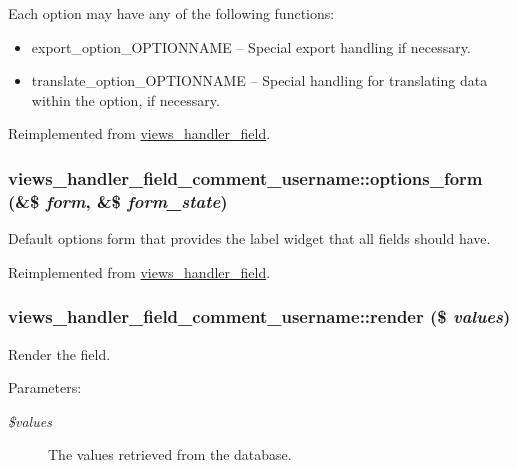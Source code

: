  Each option may have any of the following functions:\begin{itemize}
\item export\_\-option\_\-OPTIONNAME -- Special export handling if necessary.\item translate\_\-option\_\-OPTIONNAME -- Special handling for translating data within the option, if necessary. \end{itemize}


Reimplemented from \hyperlink{classviews__handler__field_64c69a8a3697603f8283405071c25b76}{views\_\-handler\_\-field}.\hypertarget{classviews__handler__field__comment__username_9bcc4bbe9ebbd7247431cfc18c5bab9c}{
\subsubsection[{options\_\-form}]{\setlength{\rightskip}{0pt plus 5cm}views\_\-handler\_\-field\_\-comment\_\-username::options\_\-form (\&\$ {\em form}, \/  \&\$ {\em form\_\-state})}}
\label{classviews__handler__field__comment__username_9bcc4bbe9ebbd7247431cfc18c5bab9c}


Default options form that provides the label widget that all fields should have. 

Reimplemented from \hyperlink{classviews__handler__field_0435d161922b7b4b84f02a2e79bb947a}{views\_\-handler\_\-field}.\hypertarget{classviews__handler__field__comment__username_cbef770bc32e839510f616413fd83493}{
\subsubsection[{render}]{\setlength{\rightskip}{0pt plus 5cm}views\_\-handler\_\-field\_\-comment\_\-username::render (\$ {\em values})}}
\label{classviews__handler__field__comment__username_cbef770bc32e839510f616413fd83493}


Render the field.

\begin{Desc}
\item[Parameters:]
\begin{description}
\item[{\em \$values}]The values retrieved from the database. \end{description}
\end{Desc}


